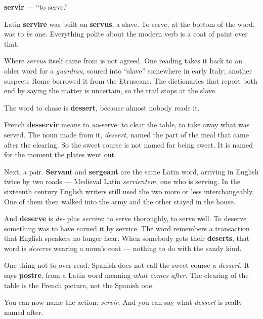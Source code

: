 \begin{cousinweb}
\textbf{servir} — \textquotedblleft{}to serve.\textquotedblright{}

Latin \textbf{servire} was built on \textbf{servus}, a slave. To serve, at the bottom of the word, was to \emph{be} one. Everything polite about the modern verb is a coat of paint over that.

Where \emph{servus} itself came from is not agreed. One reading takes it back to an older word for a \emph{guardian}, soured into \textquotedblleft{}slave\textquotedblright{} somewhere in early Italy; another suspects Rome borrowed it from the Etruscans. The dictionaries that report both end by saying the matter is uncertain, so the trail stops at the slave.

The word to chase is \textbf{dessert}, because almost nobody reads it.

French \textbf{desservir} means to \emph{un}-serve: to clear the table, to take away what was served. The noun made from it, \emph{dessert}, named the part of the meal that came after the clearing. So the sweet course is not named for being sweet. It is named for the moment the plates went out.

Next, a pair. \textbf{Servant} and \textbf{sergeant} are the same Latin word, arriving in English twice by two roads — Medieval Latin \emph{servientem}, one who is serving. In the sixteenth century English writers still used the two more or less interchangeably. One of them then walked into the army and the other stayed in the house.

And \textbf{deserve} is \emph{de-} plus \emph{servire}: to serve thoroughly, to serve well. To deserve something was to have earned it by service. The word remembers a transaction that English speakers no longer hear. When somebody gets their \textbf{deserts}, that word is \emph{deserve} wearing a noun's coat — nothing to do with the sandy kind.

One thing not to over-read. Spanish does not call the sweet course a \emph{dessert}. It says \textbf{postre}, from a Latin word meaning \emph{what comes after}. The clearing of the table is the French picture, not the Spanish one.
\end{cousinweb}

\begin{grammarlens}[title={What you've built}]
You can now name the action: \emph{servir}. And you can say what \emph{dessert} is really named after.
\end{grammarlens}

